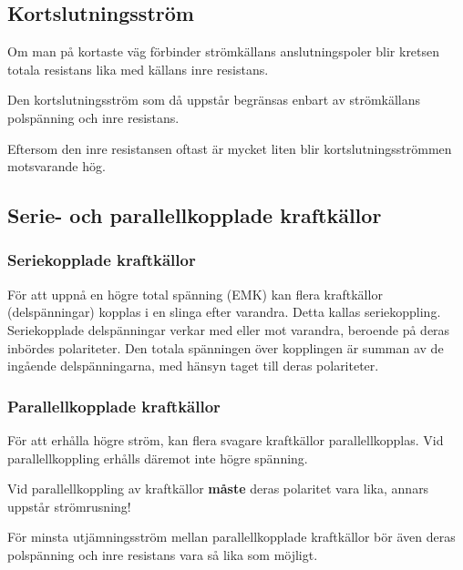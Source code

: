 \subsection{Kortslutningsström}

Om man på kortaste väg förbinder strömkällans anslutningspoler blir kretsen
totala resistans lika med källans inre resistans.

Den kortslutningsström som då uppstår begränsas enbart av strömkällans
polspänning och inre resistans.

Eftersom den inre resistansen oftast är mycket liten blir kortslutningsströmmen
motsvarande hög.

\subsection{Serie- och parallellkopplade kraftkällor}

\subsubsection{Seriekopplade kraftkällor}

För att uppnå en högre total spänning (EMK) kan flera kraftkällor
(delspänningar) kopplas i en slinga efter varandra. Detta kallas
seriekoppling.  Seriekopplade delspänningar verkar med eller mot
varandra, beroende på deras inbördes polariteter. Den totala
spänningen över kopplingen är summan av de ingående delspänningarna,
med hänsyn taget till deras polariteter.

\subsubsection{Parallellkopplade kraftkällor}


För att erhålla högre ström, kan flera svagare kraftkällor parallellkopplas.
Vid parallellkoppling erhålls däremot inte högre spänning.

Vid parallellkoppling av kraftkällor \textbf{måste} deras polaritet
vara lika, annars uppstår strömrusning!

För minsta utjämningsström mellan parallellkopplade kraftkällor bör även deras
polspänning och inre resistans vara så lika som möjligt.
